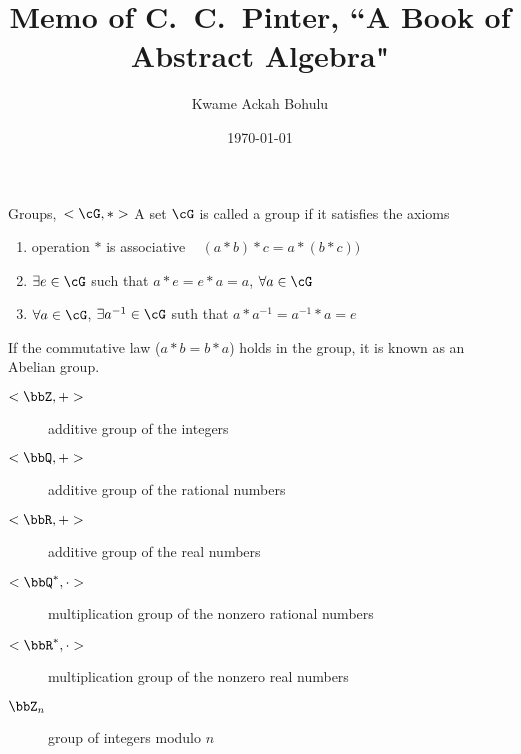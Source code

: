 \documentclass[11pt, oneside, dvipdfmx]{book}
\title{Memo of C.~C.~Pinter, ``A Book of Abstract Algebra"}
\author{Kwame Ackah Bohulu}
\date{\today}
\begin{document}
\maketitle

\begin{MyDefinition}{Groups,~$< \cG, * >$}
A set $\cG$ is called a group if it satisfies the axioms
 \begin{enumerate}
 \item operation $*$ is associative  \ie~ $(a*b) * c = a* (b * c ))$
 \item $\exists e\in \cG$ such that $a * e = e * a =a$, $\forall a \in \cG$
 \item $\forall a\in \cG$, $\exists a^{-1}\in \cG$ suth that
 $a * a^{-1} = a^{-1} * a  = e$
\end{enumerate}
If the commutative law ($a * b = b * a$) holds in the group, it is known as an Abelian group.
\end{MyDefinition}

\begin{description}
  \item[$<\bbZ,+>$] additive group of the integers
  \item[$<\bbQ,+>$] additive group of the rational numbers
  \item[$<\bbR,+>$] additive group of the real numbers
  \item[$<\bbQ^*,\cdot>$] multiplication group of the nonzero rational numbers
  \item[$<\bbR^*,\cdot>$] multiplication group of the nonzero real numbers
  \item[$\bbZ_n$] group of integers modulo $n$
\end{description}
\end{document}
